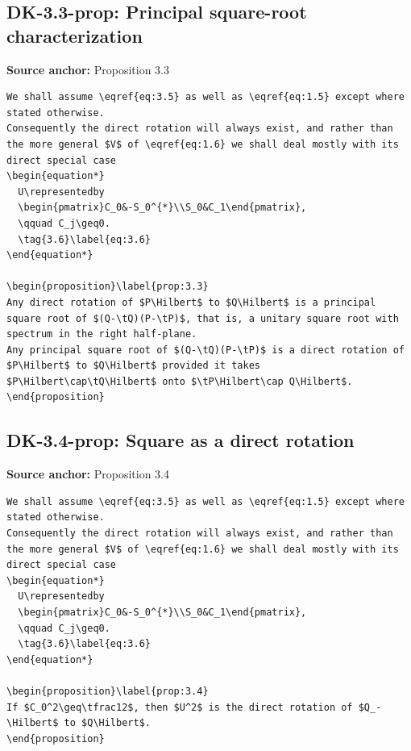 \subsection*{DK-3.3-prop: Principal square-root characterization}
\noindent\textbf{Source anchor:} Proposition 3.3\\
\begin{verbatim}
We shall assume \eqref{eq:3.5} as well as \eqref{eq:1.5} except where stated otherwise.
Consequently the direct rotation will always exist, and rather than the more general $V$ of \eqref{eq:1.6} we shall deal mostly with its direct special case
\begin{equation*}
  U\representedby
  \begin{pmatrix}C_0&-S_0^{*}\\S_0&C_1\end{pmatrix},
  \qquad C_j\geq0.
  \tag{3.6}\label{eq:3.6}
\end{equation*}

\begin{proposition}\label{prop:3.3}
Any direct rotation of $P\Hilbert$ to $Q\Hilbert$ is a principal square root of $(Q-\tQ)(P-\tP)$, that is, a unitary square root with spectrum in the right half-plane.
Any principal square root of $(Q-\tQ)(P-\tP)$ is a direct rotation of $P\Hilbert$ to $Q\Hilbert$ provided it takes $P\Hilbert\cap\tQ\Hilbert$ onto $\tP\Hilbert\cap Q\Hilbert$.
\end{proposition}
\end{verbatim}

\subsection*{DK-3.4-prop: Square as a direct rotation}
\noindent\textbf{Source anchor:} Proposition 3.4\\
\begin{verbatim}
We shall assume \eqref{eq:3.5} as well as \eqref{eq:1.5} except where stated otherwise.
Consequently the direct rotation will always exist, and rather than the more general $V$ of \eqref{eq:1.6} we shall deal mostly with its direct special case
\begin{equation*}
  U\representedby
  \begin{pmatrix}C_0&-S_0^{*}\\S_0&C_1\end{pmatrix},
  \qquad C_j\geq0.
  \tag{3.6}\label{eq:3.6}
\end{equation*}

\begin{proposition}\label{prop:3.4}
If $C_0^2\geq\tfrac12$, then $U^2$ is the direct rotation of $Q_-\Hilbert$ to $Q\Hilbert$.
\end{proposition}
\end{verbatim}

